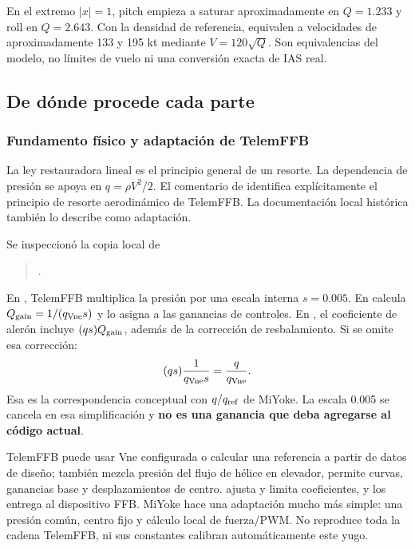 En el extremo $|x|=1$, pitch empieza a saturar aproximadamente en $Q=1.233$ y roll en $Q=2.643$. Con la densidad de referencia, equivalen a velocidades de aproximadamente 133 y 195 kt mediante $V=120\sqrt Q$. Son equivalencias del modelo, no límites de vuelo ni una conversión exacta de IAS real.

\subsection{De dónde procede cada parte}
\subsubsection{Fundamento físico y adaptación de TelemFFB}
La ley restauradora lineal es el principio general de un resorte. La dependencia de presión se apoya en $q=\rho V^2/2$. El comentario de  identifica explícitamente el principio de resorte aerodinámico de TelemFFB. La documentación local histórica también lo describe como adaptación.

Se inspeccionó la copia local de
\begin{quote}\small
{}\par
{}.
\end{quote}
En , TelemFFB multiplica la presión por una escala interna $s=0.005$. En  calcula $Q_{\rm gain}=1/(q_{\rm Vne}s)$ y lo asigna a las ganancias de controles. En , el coeficiente de alerón incluye $(q s)Q_{\rm gain}$, además de la corrección de resbalamiento. Si se omite esa corrección:
\begin{equation}
(q s)\frac{1}{q_{\rm Vne}s}=\frac{q}{q_{\rm Vne}}.
\end{equation}
Esa es la correspondencia conceptual con $q/q_{\rm ref}$ de MiYoke. La escala 0.005 se cancela en esa simplificación y \textbf{no es una ganancia que deba agregarse al código actual}.

TelemFFB puede usar Vne configurada o calcular una referencia a partir de datos de diseño; también mezcla presión del flujo de hélice en elevador, permite curvas, ganancias base y desplazamientos de centro.  ajusta y limita coeficientes, y  los entrega al dispositivo FFB. MiYoke hace una adaptación mucho más simple: una presión común, centro fijo y cálculo local de fuerza/PWM. No reproduce toda la cadena TelemFFB, ni sus constantes calibran automáticamente este yugo.

